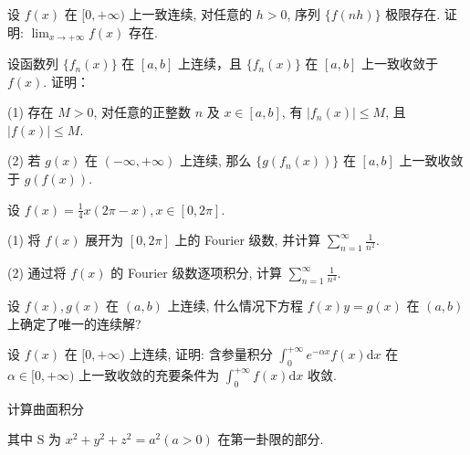 设 $f(x)$ 在 $[0, +\infty)$ 上一致连续, 对任意的 $h > 0$, 序列 $\{f(nh)\}$ 极限存在. 证明: $\lim_{x \to +\infty} f(x)$ 存在.\par
设函数列 $\{f_n(x)\}$ 在 $[a, b]$ 上连续，且 $\{f_n(x)\}$ 在 $[a, b]$ 上一致收敛于 $f(x)$. 证明：\par
(1) 存在 $M > 0$, 对任意的正整数 $n$ 及 $x \in [a, b]$, 有 $|f_n(x)| \leq M$, 且 $|f(x)| \leq M$.\par
(2) 若 $g(x)$ 在 $(- \infty, + \infty)$ 上连续, 那么 $\{g(f_n(x))\}$ 在 $[a, b]$ 上一致收敛于 $g(f(x))$.\par
设 $f(x) = \frac{1}{4} x (2\pi - x), x \in [0, 2\pi]$.\par
(1) 将 $f(x)$ 展开为 $[0, 2\pi]$ 上的 Fourier 级数, 并计算 $\sum_{n=1}^{\infty} \frac{1}{n^2}$.\par
(2) 通过将 $f(x)$ 的 Fourier 级数逐项积分, 计算 $\sum_{n=1}^{\infty} \frac{1}{n^4}$.\par
设 $f(x), g(x)$ 在 $(a, b)$ 上连续, 什么情况下方程 $f(x)y = g(x)$ 在 $(a, b)$ 上确定了唯一的连续解?\par
设 $f(x)$ 在 $[0, +\infty)$ 上连续, 证明: 含参量积分 $\int_{0}^{+\infty} e^{-\alpha x} f(x) \mathrm{d}x$ 在 $\alpha \in [0, +\infty)$ 上一致收敛的充要条件为 $\int_{0}^{+\infty} f(x) \mathrm{d}x$ 收敛.\par
\par{}
计算曲面积分\par
\nopagebreak[4]
其中 S 为  $x^{2} + y^{2} + z^{2} = a^{2} (a > 0)$  在第一卦限的部分.\par
